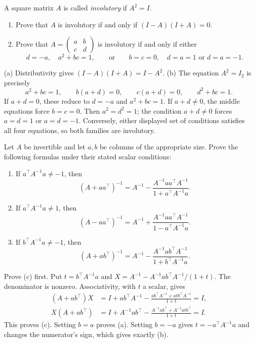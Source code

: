 \begin{problem}\label{ex:02:involutory}
A square matrix $A$ is called \emph{involutory} if $A^2=I$.
\begin{enumerate}
\item Prove that $A$ is involutory if and only if $(I-A)(I+A)=0$.
\item Prove that $A=\begin{pmatrix}a&b\\c&d\end{pmatrix}$ is involutory
if and only if either
\[
d=-a,\quad a^2+bc=1,
\qquad\text{or}\qquad
b=c=0,\quad d=a=1\text{ or }d=a=-1.
\]
\end{enumerate}
\end{problem}
\begin{solution}
(a) Distributivity gives $(I-A)(I+A)=I-A^2$.
(b) The equation $A^2=I_2$ is precisely
\[
a^2+bc=1,\qquad b(a+d)=0,\qquad c(a+d)=0,\qquad d^2+bc=1.
\]
If $a+d=0$, these reduce to $d=-a$ and $a^2+bc=1$.
If $a+d\ne0$, the middle equations force $b=c=0$. Then
$a^2=d^2=1$; the condition $a+d\ne0$ forces $a=d=1$ or $a=d=-1$.
Conversely, either displayed set of conditions satisfies all four equations,
so both families are involutory.
\end{solution}

\begin{problem}\label{ex:02:outer-inverse}
Let $A$ be invertible and let $a,b$ be columns of the appropriate size.
Prove the following formulas under their stated scalar conditions:
\begin{enumerate}
\item If $a^\top A^{-1}a\ne-1$, then
\[
(A+aa^\top)^{-1}=A^{-1}
-\frac{A^{-1}aa^\top A^{-1}}{1+a^\top A^{-1}a}.
\]
\item If $a^\top A^{-1}a\ne1$, then
\[
(A-aa^\top)^{-1}=A^{-1}
+\frac{A^{-1}aa^\top A^{-1}}{1-a^\top A^{-1}a}.
\]
\item If $b^\top A^{-1}a\ne-1$, then
\[
(A+ab^\top)^{-1}=A^{-1}
-\frac{A^{-1}ab^\top A^{-1}}{1+b^\top A^{-1}a}.
\]
\end{enumerate}
\end{problem}
\begin{solution}
Prove (c) first. Put $t=b^\top A^{-1}a$ and
$X=A^{-1}-A^{-1}ab^\top A^{-1}/(1+t)$.
The denominator is nonzero. Associativity, with $t$ a scalar, gives
\begin{align*}
(A+ab^\top)X
 &=I+ab^\top A^{-1}
   -\frac{ab^\top A^{-1}+atb^\top A^{-1}}{1+t}=I,\\
X(A+ab^\top)
 &=I+A^{-1}ab^\top
   -\frac{A^{-1}ab^\top+A^{-1}atb^\top}{1+t}=I.
\end{align*}
This proves (c). Setting $b=a$ proves (a).
Setting $b=-a$ gives $t=-a^\top A^{-1}a$ and changes the numerator's sign,
which gives exactly (b).
\end{solution}


